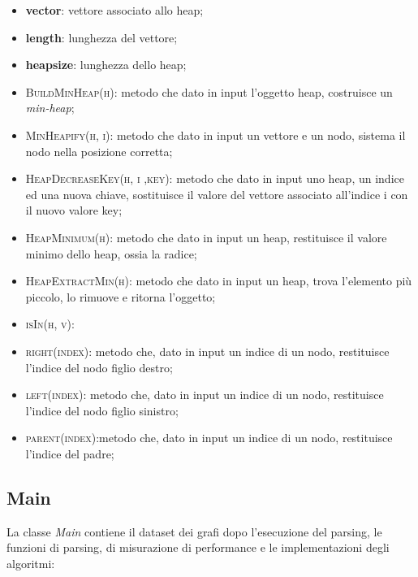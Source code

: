 \begin{itemize}
    \item \textbf{vector}: vettore associato allo heap;
    \item \textbf{length}: lunghezza del vettore;
    \item \textbf{heapsize}: lunghezza dello heap;
    \item \textsc{BuildMinHeap(h)}: metodo che dato in input l'oggetto heap, costruisce un \textit{min-heap};
    \item \textsc{MinHeapify(h, i)}: metodo che dato in input un vettore e un nodo, sistema il nodo nella posizione corretta;
    \item \textsc{HeapDecreaseKey(h, i ,key)}: metodo che dato in input uno heap, un indice ed una nuova chiave, sostituisce il valore del vettore associato all'indice i con il nuovo valore key;
    \item \textsc{HeapMinimum(h)}: metodo che dato in input un heap, restituisce il valore minimo dello heap, ossia la radice;
    \item \textsc{HeapExtractMin(h)}: metodo che dato in input un heap, trova l'elemento più piccolo, lo rimuove e ritorna l'oggetto;
    \item \textsc{isIn(h, v)}:
    \item \textsc{right(index)}: metodo che, dato in input un indice di un nodo, restituisce l'indice del nodo figlio destro;
    \item \textsc{left(index)}: metodo che, dato in input un indice di un nodo, restituisce l'indice del nodo figlio sinistro;
    \item \textsc{parent(index)}:metodo che, dato in input un indice di un nodo, restituisce l'indice del padre;
\end{itemize}


\newpage


\subsection{Main}
\label{Main}

La classe \textit{Main} contiene il dataset dei grafi dopo l'esecuzione del parsing, le funzioni di parsing, di misurazione di performance e le implementazioni degli algoritmi:

